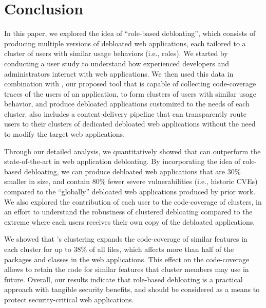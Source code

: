 \section{Conclusion}

In this paper, we explored the idea of ``role-based debloating'', which consists of producing multiple versions of debloated web applications, each tailored to a cluster of users with similar usage behaviors (i.e., roles). 
We started by conducting a user study to understand how experienced developers and administrators interact with web applications. 
We then used this data in combination with \sys{}, our proposed tool that is capable of collecting code-coverage traces of the users of an application, to form clusters of users with similar usage behavior, and produce debloated applications customized to the needs of each cluster. 
\sys{} also includes a content-delivery pipeline that can transparently route users to their clusters of dedicated debloated web applications without the need to modify the target web applications. 

Through our detailed analysis, we quantitatively showed that \sys{} can outperform the state-of-the-art in web application debloating. 
By incorporating the idea of role-based debloating, we can produce debloated web applications that are 30\% smaller in size, and contain 80\% fewer severe vulnerabilities (i.e., historic CVEs) compared to the ``globally'' debloated web applications produced by prior work. We also explored the contribution of each user to the code-coverage of clusters, in an effort to understand the robustness of clustered debloating compared to the extreme where each users receives their own copy of the debloated applications. 

We showed that \sys{}'s clustering expands the code-coverage of similar features in each cluster for up to 38\% of all files, which affects more than half of the packages and classes in the web applications. This effect on the code-coverage allows \sys{} to retain the code for similar features that cluster members may use in future. 
Overall, our results indicate that role-based debloating is a practical approach with tangible security benefits, and should be considered as a means to protect security-critical web applications. 

